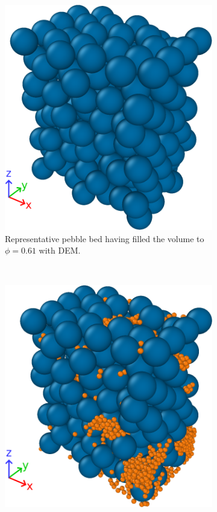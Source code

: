 \begin{figure}[!ht]
    \centering
    \begin{subfigure}[b]{0.44\textwidth}
        \includegraphics[width = \textwidth]{figures/lbm/lbm-thesis-filled.png}
        \caption{Representative pebble bed having filled the volume to $\phi = 0.61$ with DEM.}\label{fig:lbm-filled}
    \end{subfigure}
    ~
    \begin{subfigure}[b]{0.44\textwidth}
        \includegraphics[width = \textwidth]{figures/lbm/lbm-thesis-crushed.png}

\end{subfigure}
\end{figure}
